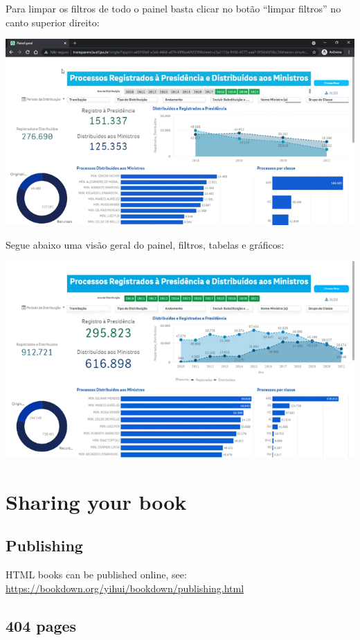\documentclass[
]{book}
\begin{document}
Para limpar os filtros de todo o painel basta clicar no botão ``limpar filtros'' no canto superior direito:

\includegraphics[width=1\linewidth]{imagens/fig-cap6-4}

Segue abaixo uma visão geral do painel, filtros, tabelas e gráficos:

\includegraphics[width=1\linewidth]{imagens/fig-cap6-5}

\hypertarget{sharing-your-book}{%
\chapter{Sharing your book}\label{sharing-your-book}}

\hypertarget{publishing}{%
\section{Publishing}\label{publishing}}

HTML books can be published online, see: \url{https://bookdown.org/yihui/bookdown/publishing.html}

\hypertarget{pages}{%
\section{404 pages}\label{pages}}
\end{document}
